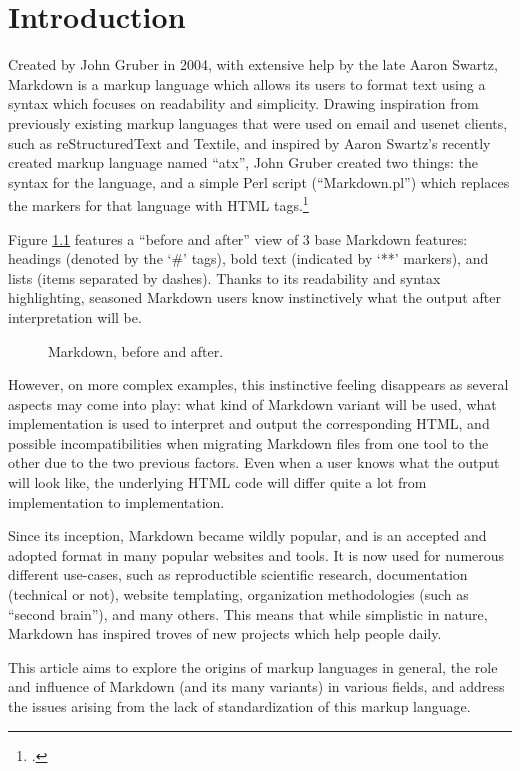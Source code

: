 \chapter{Introduction}

\vspace{1cm}

Created by John Gruber in 2004, with extensive help by the late Aaron Swartz, Markdown is a markup language which allows its users to format
text using a syntax which focuses on readability and simplicity.
Drawing inspiration from previously existing markup languages that were used on email and usenet clients, such as reStructuredText and Textile,
and inspired by Aaron Swartz's recently created markup language named ``atx'', John Gruber created two things: the syntax for the language, and a simple
Perl script (``Markdown.pl'') which replaces the markers for that language with HTML tags.\footcite{gruber2004markdown}\newline

Figure \ref{fig:example-simple-syntax} features a ``before and after'' view of 3 base Markdown features: headings (denoted by the `\#' tags),
bold text (indicated by `**' markers), and lists (items separated by dashes). Thanks to its readability and syntax highlighting, seasoned
Markdown users know instinctively what the output after interpretation will be.

\begin{figure}[H]%
    \hspace{-3cm}
    \qquad
    \caption{Markdown, before and after.}
    \label{fig:example-simple-syntax}
\end{figure}

\newpage

However, on more complex examples, this instinctive feeling disappears as several aspects may come into play: what kind of Markdown variant will
be used, what implementation is used to interpret and output the corresponding HTML, and possible incompatibilities when migrating Markdown files
from one tool to the other due to the two previous factors. Even when a user knows what the output will look like, the underlying HTML code
will differ quite a lot from implementation to implementation.\newline

Since its inception, Markdown became wildly popular, and is an accepted and adopted format in many popular websites and tools. It is now used for
numerous different use-cases, such as reproductible scientific research, documentation (technical or not), website templating, organization
methodologies (such as ``second brain''), and many others. This means that while simplistic in nature, Markdown has inspired troves of
new projects which help people daily.\newline

This article aims to explore the origins of markup languages in general, the role and influence of Markdown (and its many variants)
in various fields, and address the issues arising from the lack of standardization of this markup language.